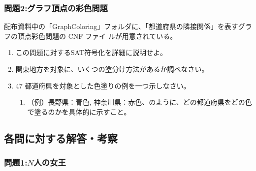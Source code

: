 \documentclass[dvipdfmx]{jsarticle}
\begin{document}
\subsubsection{問題2:グラフ頂点の彩色問題}
配布資料中の「GraphColoring」フォルダに、「都道府県の隣接関係」を表すグラフの頂点彩色問題の CNF ファイ
ルが用意されている。
\begin{enumerate}
  \item この問題に対するSAT符号化を詳細に説明せよ。
  \item 関東地方を対象に、いくつの塗分け方法があるか調べなさい。
  \item 47 都道府県を対象とした色塗りの例を一つ示しなさい。
  \begin{enumerate}
    \item （例）長野県：青色, 神奈川県：赤色、のように、どの都道府県をどの色で塗るのかを具体的に示すこと。
  \end{enumerate}
\end{enumerate}
\subsection{各問に対する解答・考察}
\subsubsection{問題1:$N$人の女王}
\end{document}
